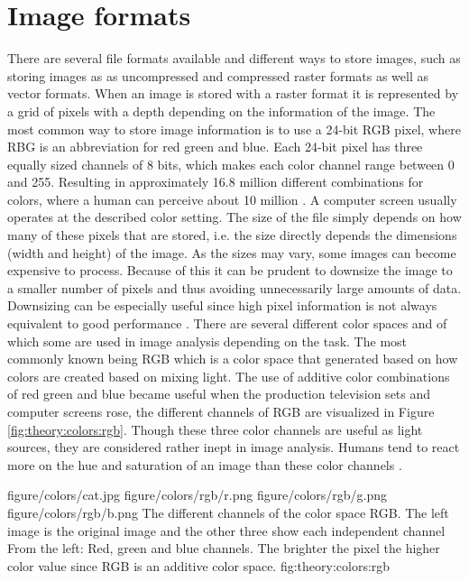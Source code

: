 \section{Image formats}
\label{sec:theory:image_formats}
There are several file formats available and different ways to store images, such as storing images as as uncompressed and compressed raster formats as well as vector formats. When an image is stored with a raster format it is represented by a grid of pixels with a depth depending on the information of the image. The most common way to store image information is to use a 24-bit RGB pixel, where RBG is an abbreviation for red green and blue. Each 24-bit pixel has three equally sized channels of 8 bits, which makes each color channel range between 0 and 255. Resulting in approximately 16.8 million different combinations for colors, where a human can perceive about 10 million \cite[p.388]{judd1975color}. A computer screen usually operates at the described color setting. The size of the file simply depends on how many of these pixels that are stored, i.e. the size directly depends the dimensions (width and height) of the image. As the sizes may vary, some images can become expensive to process. Because of this it can be prudent to downsize the image to a smaller number of pixels and thus avoiding unnecessarily large amounts of data. Downsizing can be especially useful since high pixel information is not always equivalent to good performance \cite{torralba200880}.
There are several different color spaces and of which some are used in image analysis depending on the task. The most commonly known being RGB which is a color space that generated based on how colors are created based on mixing light. The use of additive color combinations of red green and blue became useful when the production television sets and computer screens rose, the different channels of RGB are visualized in Figure \ref{fig:theory:colors:rgb}. Though these three color channels are useful as light sources, they are considered rather inept in image analysis. Humans tend to react more on the hue and saturation of an image than these color channels \cite{alzu2015semantic}\cite{cheng2001color}. 


\fourfigure
{figure/colors/cat.jpg}
{figure/colors/rgb/r.png}
{figure/colors/rgb/g.png}
{figure/colors/rgb/b.png}
{The different channels of the color space RGB. The left image is the original image and the other three show each independent channel From the left: Red, green and blue channels. The brighter the pixel the higher color value since RGB is an additive color space.}
{fig:theory:colors:rgb} 

